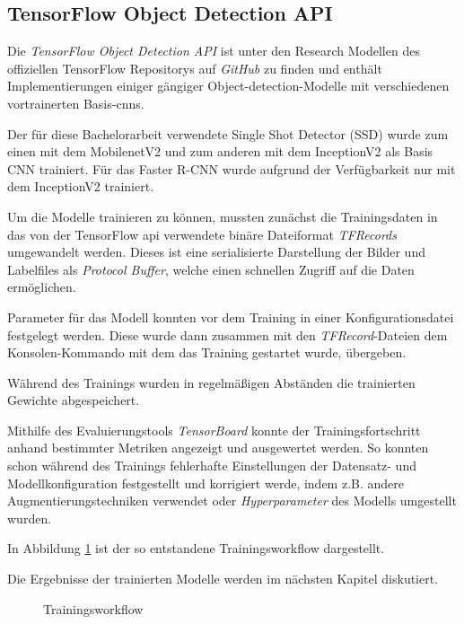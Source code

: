 \subsection{TensorFlow Object Detection API}

Die \textit{TensorFlow Object Detection API} ist unter den
Research Modellen des offiziellen TensorFlow
Repositorys auf \textit{GitHub} zu finden \cite{tfobjdet}
und enthält Implementierungen
einiger gängiger Object-detection-Modelle mit verschiedenen 
vortrainerten Basis-\Glspl{cnn}.

Der für diese Bachelorarbeit verwendete Single 
Shot Detector (SSD) wurde zum einen mit dem 
MobilenetV2 und zum anderen mit dem 
InceptionV2 als Basis CNN trainiert.
Für das Faster R-CNN wurde aufgrund 
der Verfügbarkeit nur mit dem InceptionV2
trainiert.

Um die Modelle trainieren zu können, mussten zunächst die 
Trainingsdaten in das von der TensorFlow \Gls{api}
verwendete binäre Dateiformat \textit{TFRecords} 
umgewandelt werden.
Dieses ist eine serialisierte Darstellung der Bilder
 und Labelfiles als \textit{Protocol Buffer},
welche einen schnellen Zugriff auf die Daten ermöglichen.

Parameter für das Modell konnten vor dem Training 
in einer Konfigurationsdatei festgelegt werden.
Diese wurde dann zusammen mit den \textit{TFRecord}-Dateien 
dem Konsolen-Kommando mit dem das Training 
gestartet wurde, übergeben.

Während des Trainings wurden in regelmäßigen 
Abständen die trainierten Gewichte abgespeichert.

Mithilfe des Evaluierungstools \textit{TensorBoard}
konnte der Trainingsfortschritt anhand bestimmter
Metriken angezeigt und ausgewertet werden. So konnten schon während des Trainings fehlerhafte
Einstellungen der Datensatz- und 
Modellkonfiguration festgestellt 
und korrigiert werde, indem z.B. andere
Augmentierungstechniken verwendet
oder \textit{Hyperparameter} des
Modells umgestellt wurden.

In Abbildung \ref{fig:train_workflow}
ist der so entstandene Trainingsworkflow dargestellt.

Die Ergebnisse der trainierten Modelle 
werden im nächsten Kapitel diskutiert.
\vspace{1cm}

\begin{figure}[H]
    \centering
    
    \caption{Trainingsworkflow}
    \label{fig:train_workflow}
\end{figure}
\vspace{1cm}


